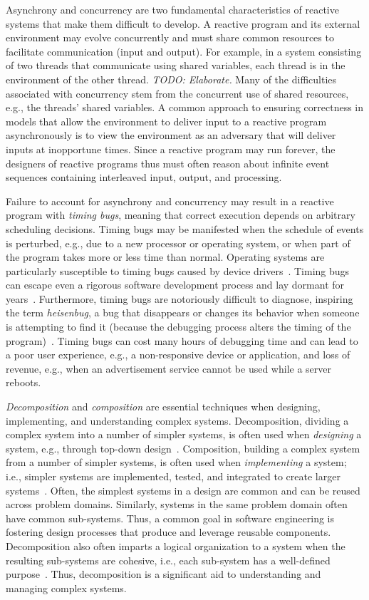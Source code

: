 Asynchrony and concurrency are two fundamental characteristics of reactive systems that make them difficult to develop.
A reactive program and its external environment may evolve concurrently and must share common resources to facilitate communication (input and output).
For example, in a system consisting of two threads that communicate using shared variables, each thread is in the environment of the other thread.
\emph{TODO:  Elaborate.}
Many of the difficulties associated with concurrency stem from the concurrent use of shared resources, e.g., the threads' shared variables.
A common approach to ensuring correctness in models that allow the environment to deliver input to a reactive program asynchronously is to view the environment as an adversary that will deliver inputs at inopportune times.
Since a reactive program may run forever, the designers of reactive programs thus must often reason about infinite event sequences containing interleaved input, output, and processing.

Failure to account for asynchrony and concurrency may result in a reactive program with \emph{timing bugs}, meaning that correct execution depends on arbitrary scheduling decisions.
Timing bugs may be manifested when the schedule of events is perturbed, e.g., due to a new processor or operating system, or when part of the program takes more or less time than normal.
Operating systems are particularly susceptible to timing bugs caused by device drivers~\cite{ryzhyk2009dingo}.
Timing bugs can escape even a rigorous software development process and lay dormant for years~\cite{lee2006problem}.
Furthermore, timing bugs are notoriously difficult to diagnose, inspiring the term \emph{heisenbug}, a bug that disappears or changes its behavior when someone is attempting to find it (because the debugging process alters the timing of the program)~\cite{1983proceedings}.
Timing bugs can cost many hours of debugging time and can lead to a poor user experience, e.g., a non-responsive device or application, and loss of revenue, e.g., when an advertisement service cannot be used while a server reboots.

\emph{Decomposition} and \emph{composition} are essential techniques when designing, implementing, and understanding complex systems.
Decomposition, dividing a complex system into a number of simpler systems, is often used when \emph{designing} a system, e.g., through top-down design~\cite{wirth1971program}.
Composition, building a complex system from a number of simpler systems, is often used when \emph{implementing} a system; i.e., simpler systems are implemented, tested, and integrated to create larger systems~\cite{brooks1995mythical}.
Often, the simplest systems in a design are common and can be reused across problem domains.
Similarly, systems in the same problem domain often have common sub-systems.
Thus, a common goal in software engineering is fostering design processes that produce and leverage reusable components.
Decomposition also often imparts a logical organization to a system when the resulting sub-systems are cohesive, i.e., each sub-system has a well-defined purpose~\cite{parnas1972criteria}.
Thus, decomposition is a significant aid to understanding and managing complex systems.

